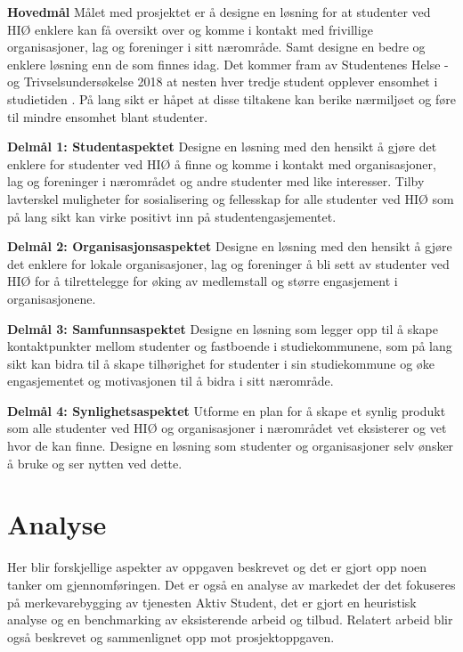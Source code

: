 \begin{compactitem}
\item [{\bf Hovedmål}] Målet med prosjektet er å designe en løsning for at studenter ved HIØ enklere kan få oversikt over og komme i kontakt med frivillige organisasjoner, lag og foreninger i sitt nærområde. Samt designe en bedre og enklere løsning enn de som finnes idag. Det kommer fram av Studentenes Helse -og Trivselsundersøkelse 2018 at nesten hver tredje student opplever ensomhet i studietiden \cite{SHOT:2}. På lang sikt er håpet at disse tiltakene kan berike nærmiljøet og føre til mindre ensomhet blant studenter.
\begin{compactitem}
\item [{\bf  Delmål 1: Studentaspektet} ] Designe en løsning med den hensikt å gjøre det enklere for studenter ved HIØ å finne og komme i kontakt med organisasjoner, lag og foreninger i nærområdet og andre studenter med like interesser. Tilby lavterskel muligheter for sosialisering og fellesskap for alle studenter ved HIØ som på lang sikt kan virke positivt inn på studentengasjementet.
\item [{\bf  Delmål 2: Organisasjonsaspektet} ] Designe en løsning med den hensikt å gjøre det enklere for lokale organisasjoner, lag og foreninger å bli sett av studenter ved HIØ for å tilrettelegge for øking av medlemstall og større engasjement i organisasjonene.
\item [{\bf  Delmål 3: Samfunnsaspektet} ] Designe en løsning som legger opp til å skape kontaktpunkter mellom studenter og fastboende i studiekommunene, som på lang sikt kan bidra til å skape tilhørighet for studenter i sin studiekommune og øke engasjementet og motivasjonen til å bidra i sitt nærområde.
\item [{\bf  Delmål 4: Synlighetsaspektet} ] Utforme en plan for å skape et synlig produkt som alle studenter ved HIØ og organisasjoner i nærområdet vet eksisterer og vet hvor de kan finne. Designe en løsning som studenter og organisasjoner selv ønsker å bruke og ser nytten ved dette.
\end{compactitem} 
\end{compactitem}

\section{Analyse}
Her blir forskjellige aspekter av oppgaven beskrevet og det er gjort opp noen tanker om gjennomføringen. Det er også en analyse av markedet der det fokuseres på merkevarebygging av tjenesten Aktiv Student, det er gjort en heuristisk analyse og en benchmarking av eksisterende arbeid og tilbud. Relatert arbeid blir også beskrevet og sammenlignet opp mot prosjektoppgaven.

